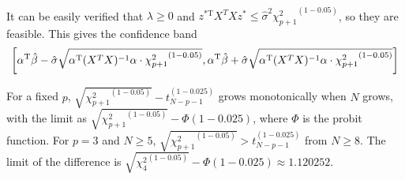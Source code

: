 \begin{sol}
\begin{enumerate}
\begin{align*}
\end{align*}
It can be easily verified that $\lambda\ge0$ and $z^\mathrm{*T}X^TXz^*\le\hat{\sigma}^2{\chi_{p+1}^2}^{(1-0.05)}$, so they are feasible. This gives the confidence band
\[
\left[\alpha^{\mathrm{T}}\hat{\beta}-\hat{\sigma}\sqrt{\alpha^{\mathrm{T}}(X^TX)^{-1}\alpha\cdot {\chi_{p+1}^2}^{(1-0.05)}},
\alpha^{\mathrm{T}}\hat{\beta}+\hat{\sigma}\sqrt{\alpha^{\mathrm{T}}(X^TX)^{-1}\alpha\cdot {\chi_{p+1}^2}^{(1-0.05)}}
\right]
\]
\end{enumerate}
For a fixed $p$, $\sqrt{{\chi_{p+1}^2}^{(1-0.05)}}-t_{N-p-1}^{(1-0.025)}$ grows monotonically when $N$ grows, with the limit as $\sqrt{{\chi_{p+1}^2}^{(1-0.05)}}-\Phi(1-0.025)$, where $\Phi$ is the probit function. For $p=3$ and $N\ge 5$, $\sqrt{{\chi_{p+1}^2}^{(1-0.05)}}>t_{N-p-1}^{(1-0.025)}$ from $N\ge 8$. The limit of the difference is $\sqrt{{\chi_{4}^2}^{(1-0.05)}}-\Phi(1-0.025)\approx 1.120252$.
\end{sol}

